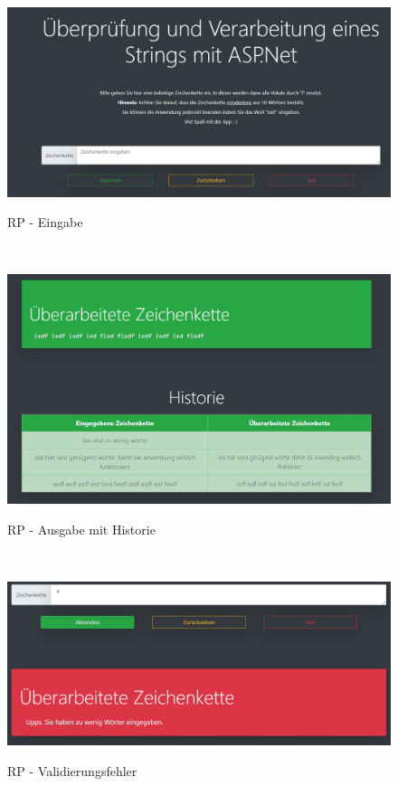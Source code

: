 \documentclass[a4paper,
12pt,
oneside]
{article}
\begin{document}
	\begin{figure}[h]
		\centering
		\caption{RP - Eingabe}
		\includegraphics[width=1\textwidth]{img/rp_form.jpg} \\
		\label{fig:input}
	\end{figure} \\
\begin{figure}[h]
	\centering
	\caption{RP - Ausgabe mit Historie}
	\includegraphics[width=1\textwidth]{img/rp-output.jpg} \\
	\label{fig:ouput}
\end{figure} \\
\begin{figure}[h]
	\centering
	\caption{RP - Validierungsfehler}
	\includegraphics[width=1\textwidth]{img/error.jpg} \\
	\label{fig:error}
\end{figure} \\
\end{document}
